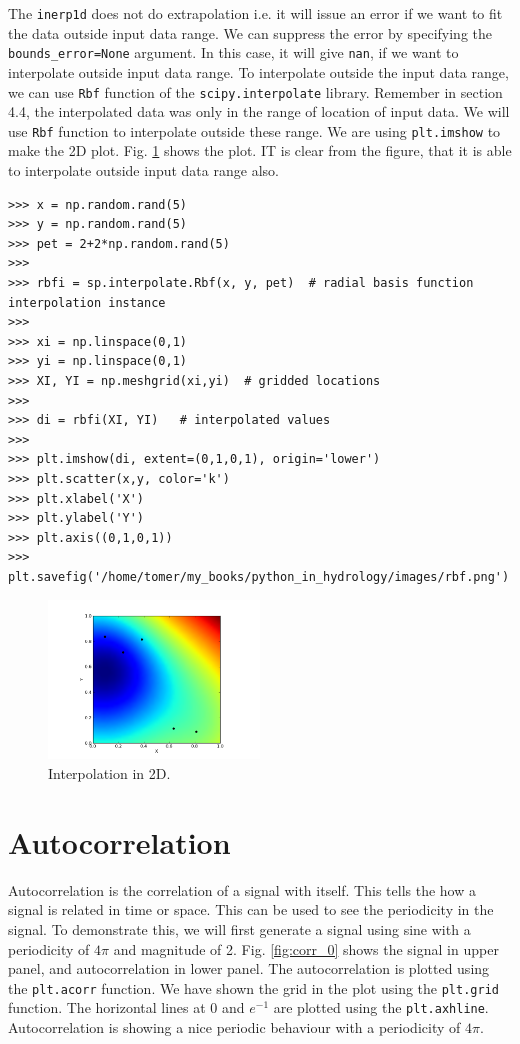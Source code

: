 \documentclass[10pt]{book}
\begin{document}
{The \verb"inerp1d" does not do extrapolation i.e. it will issue an error if we want to fit the data outside input data range. We can suppress the error by specifying the \verb"bounds_error=None" argument. In this case, it will give \verb"nan", if we want to interpolate outside input data range. To interpolate outside the input data range, we can use \verb"Rbf" function of the \verb"scipy.interpolate" library. Remember in section 4.4, the interpolated data was only in the range of location of input data. We will use \verb"Rbf" function to interpolate outside these range. We are using \verb"plt.imshow" to make the 2D plot. Fig. \ref{fig:rbf} shows the plot. IT is clear from the figure, that it is able to interpolate outside input data range also. 
\beforeverb \begin{verbatim}
>>> x = np.random.rand(5)
>>> y = np.random.rand(5)
>>> pet = 2+2*np.random.rand(5)
>>> 
>>> rbfi = sp.interpolate.Rbf(x, y, pet)  # radial basis function interpolation instance
>>> 
>>> xi = np.linspace(0,1)
>>> yi = np.linspace(0,1)
>>> XI, YI = np.meshgrid(xi,yi)  # gridded locations
>>> 
>>> di = rbfi(XI, YI)   # interpolated values
>>> 
>>> plt.imshow(di, extent=(0,1,0,1), origin='lower')
>>> plt.scatter(x,y, color='k')
>>> plt.xlabel('X')
>>> plt.ylabel('Y')
>>> plt.axis((0,1,0,1))
>>> plt.savefig('/home/tomer/my_books/python_in_hydrology/images/rbf.png')
\end{verbatim} \afterverb

\beforefig
\begin{figure}[h!]
  \centering
    \includegraphics[width=0.5\textwidth]{images/rbf.png}
  \caption{Interpolation in 2D.}
   \label{fig:rbf}
\end{figure}
\afterfig

\section{Autocorrelation}
Autocorrelation is the correlation of a signal with itself. This tells the how a signal is related in time or space. This can be used to see the periodicity in the signal. To demonstrate this, we will first generate a signal using sine with a periodicity of $4\pi$ and magnitude of 2. Fig. \ref{fig:corr_0} shows the signal in upper panel, and autocorrelation in lower panel. The autocorrelation is plotted using the \verb"plt.acorr" function. We have shown the grid in the plot using the \verb"plt.grid" function. The horizontal lines at 0 and $e^{-1}$ are plotted using the \verb"plt.axhline". Autocorrelation is showing a nice periodic behaviour with a periodicity of $4\pi$.

}
\end{document}
